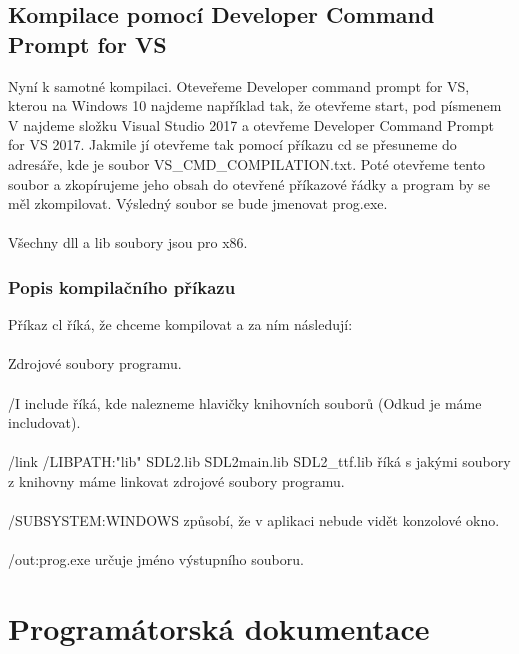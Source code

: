 \documentclass[12pt]{article}
\begin{document}
	\subsection{Kompilace pomocí Developer Command Prompt for VS}
	Nyní k samotné kompilaci. Oteveřeme Developer command prompt for VS, kterou na Windows 10 najdeme například tak, že otevřeme start, pod písmenem V najdeme složku Visual Studio 2017 a otevřeme Developer Command Prompt for VS 2017. Jakmile jí otevřeme tak pomocí příkazu cd se přesuneme do adresáře, kde je soubor VS\_CMD\_COMPILATION.txt. Poté otevřeme tento soubor a zkopírujeme jeho obsah do otevřené příkazové řádky a program by se měl zkompilovat. Výsledný soubor se bude jmenovat prog.exe. 
	\\
	\\
	Všechny dll a lib soubory jsou pro x86.
	
	\subsubsection{Popis kompilačního příkazu}
	Příkaz cl říká, že chceme kompilovat a za ním následují:
	\\
	\\
	Zdrojové soubory programu.
	\\
	\\
	/I include říká, kde nalezneme hlavičky knihovních souborů (Odkud je máme includovat).
	\\
	\\
	/link /LIBPATH:"lib" SDL2.lib SDL2main.lib SDL2\_ttf.lib říká s jakými soubory z knihovny máme linkovat zdrojové soubory programu.
	\\
	\\
	/SUBSYSTEM:WINDOWS způsobí, že v aplikaci nebude vidět konzolové okno.
	\\
	\\
	/out:prog.exe určuje jméno výstupního souboru.

	\newpage  
	\maketitle\section{Programátorská dokumentace}
\end{document}
